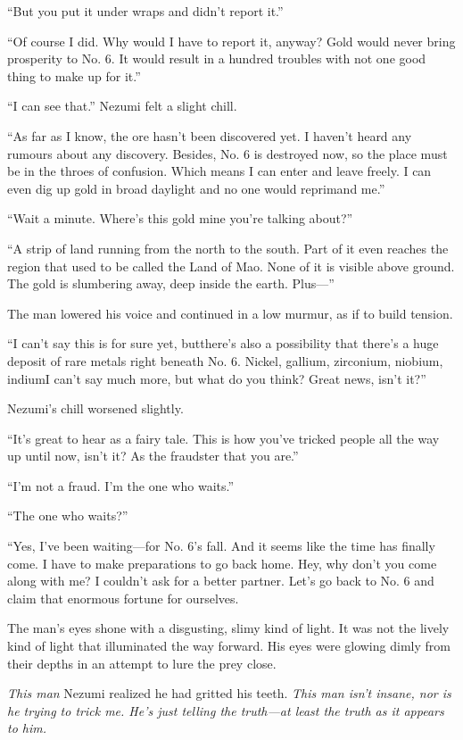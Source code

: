 ``But you put it under wraps and didn't report it.''

``Of course I did. Why would I have to report it, anyway? Gold would
never bring prosperity to No. 6. It would result in a hundred troubles
with not one good thing to make up for it.''

``I can see that.'' Nezumi felt a slight chill.

``As far as I know, the ore hasn't been discovered yet. I haven't heard
any rumours about any discovery. Besides, No. 6 is destroyed now, so the
place must be in the throes of confusion. Which means I can enter and
leave freely. I can even dig up gold in broad daylight and no one would
reprimand me.''

``Wait a minute. Where's this gold mine you're talking about?''

``A strip of land running from the north to the south. Part of it even
reaches the region that used to be called the Land of Mao. None of it is
visible above ground. The gold is slumbering away, deep inside the
earth. Plus---''

The man lowered his voice and continued in a low murmur, as if to build
tension.

``I can't say this is for sure yet, but\el there's also a possibility
that there's a huge deposit of rare metals right beneath No. 6. Nickel,
gallium, zirconium, niobium, indium\el I can't say much more, but what
do you think? Great news, isn't it?''

Nezumi's chill worsened slightly.

``\el It's great to hear as a fairy tale. This is how you've tricked
people all the way up until now, isn't it? As the fraudster that you
are.''

``I'm not a fraud. I'm the one who waits.''

``The one who waits?''

``Yes, I've been waiting---for No. 6's fall. And it seems like the time
has finally come. I have to make preparations to go back home. Hey, why
don't you come along with me? I couldn't ask for a better partner. Let's
go back to No. 6 and claim that enormous fortune for ourselves.

The man's eyes shone with a disgusting, slimy kind of light. It was not
the lively kind of light that illuminated the way forward. His eyes were
glowing dimly from their depths in an attempt to lure the prey close.

\emph{This man\el } Nezumi realized he had gritted his teeth. \emph{This man isn't
insane, nor is he trying to trick me. He's just telling the truth---at
least the truth as it appears to him.}


